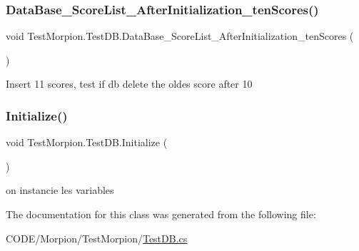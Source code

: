 \subsubsection{\texorpdfstring{Data\+Base\+\_\+\+Score\+List\+\_\+\+After\+Initialization\+\_\+ten\+Scores()}{DataBase\_ScoreList\_AfterInitialization\_tenScores()}}
{\footnotesize\ttfamily void Test\+Morpion.\+Test\+D\+B.\+Data\+Base\+\_\+\+Score\+List\+\_\+\+After\+Initialization\+\_\+ten\+Scores (\begin{DoxyParamCaption}{ }\end{DoxyParamCaption})}



Insert 11 scores, test if db delete the oldes score after 10 

\mbox{\label{class_test_morpion_1_1_test_d_b_a4ac592a6b2dc14e87feb0154285126b4}} 
\subsubsection{\texorpdfstring{Initialize()}{Initialize()}}
{\footnotesize\ttfamily void Test\+Morpion.\+Test\+D\+B.\+Initialize (\begin{DoxyParamCaption}{ }\end{DoxyParamCaption})}



on instancie les variables 



The documentation for this class was generated from the following file\+:\begin{DoxyCompactItemize}
\item 
C\+O\+D\+E/\+Morpion/\+Test\+Morpion/\hyperlink{_test_d_b_8cs}{Test\+D\+B.\+cs}\end{DoxyCompactItemize}
